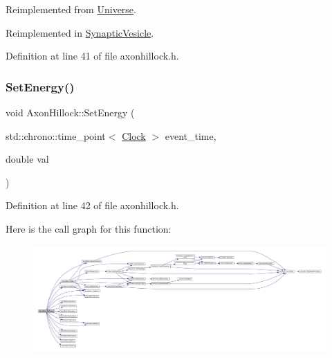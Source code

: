 Reimplemented from \hyperlink{class_universe_aa22202ae740eb1355529afcb13285e91}{Universe}.



Reimplemented in \hyperlink{class_synaptic_vesicle_a7fd7cfce5eccb904206d968866f85220}{Synaptic\+Vesicle}.



Definition at line 41 of file axonhillock.\+h.

\mbox{\label{class_axon_hillock_a830afd18810e0eaa11a9e7a500b8f0c4}} 
\subsubsection{\texorpdfstring{Set\+Energy()}{SetEnergy()}}
{\footnotesize\ttfamily void Axon\+Hillock\+::\+Set\+Energy (\begin{DoxyParamCaption}\item[{std\+::chrono\+::time\+\_\+point$<$ \hyperlink{universe_8h_a0ef8d951d1ca5ab3cfaf7ab4c7a6fd80}{Clock} $>$}]{event\+\_\+time,  }\item[{double}]{val }\end{DoxyParamCaption})\hspace{0.3cm}{\ttfamily [inline]}}



Definition at line 42 of file axonhillock.\+h.

Here is the call graph for this function\+:
\nopagebreak
\begin{figure}[H]
\begin{center}
\leavevmode
\includegraphics[width=350pt]{class_axon_hillock_a830afd18810e0eaa11a9e7a500b8f0c4_cgraph}
\end{center}
\end{figure}
\mbox{\label{class_axon_hillock_a5a6a6a93a98b32c303b9ee6320c09909}} 
